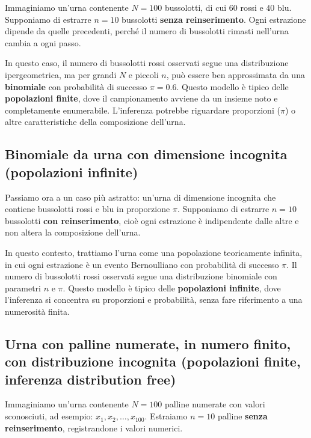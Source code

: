 \documentclass[
  11pt,
]{book}
\theoremstyle{mytheoremstyle}
\theoremstyle{mydefstyle}
\begin{document}
Immaginiamo un'urna contenente \(N = 100\) bussolotti, di cui \(60\) rossi e \(40\) blu. Supponiamo di estrarre \(n = 10\) bussolotti \textbf{senza reinserimento}. Ogni estrazione dipende da quelle precedenti, perché il numero di bussolotti rimasti nell'urna cambia a ogni passo.

In questo caso, il numero di bussolotti rossi osservati segue una distribuzione ipergeometrica, ma per grandi \(N\) e piccoli \(n\), può essere ben approssimata da una \textbf{binomiale} con probabilità di successo \(\pi = 0.6\). Questo modello è tipico delle \textbf{popolazioni finite}, dove il campionamento avviene da un insieme noto e completamente enumerabile. L'inferenza potrebbe riguardare proporzioni (\(\pi\)) o altre caratteristiche della composizione dell'urna.

\subsection{Binomiale da urna con dimensione incognita (popolazioni infinite)}\label{binomiale-da-urna-con-dimensione-incognita-popolazioni-infinite}

Passiamo ora a un caso più astratto: un'urna di dimensione incognita che contiene bussolotti rossi e blu in proporzione \(\pi\). Supponiamo di estrarre \(n = 10\) bussolotti \textbf{con reinserimento}, cioè ogni estrazione è indipendente dalle altre e non altera la composizione dell'urna.

In questo contesto, trattiamo l'urna come una popolazione teoricamente infinita, in cui ogni estrazione è un evento Bernoulliano con probabilità di successo \(\pi\). Il numero di bussolotti rossi osservati segue una distribuzione binomiale con parametri \(n\) e \(\pi\). Questo modello è tipico delle \textbf{popolazioni infinite}, dove l'inferenza si concentra su proporzioni e probabilità, senza fare riferimento a una numerosità finita.

\subsection{Urna con palline numerate, in numero finito, con distribuzione incognita (popolazioni finite, inferenza distribution free)}\label{urna-con-palline-numerate-in-numero-finito-con-distribuzione-incognita-popolazioni-finite-inferenza-distribution-free}

Immaginiamo un'urna contenente \(N = 100\) palline numerate con valori sconosciuti, ad esempio: \(x_1, x_2, \dots, x_{100}\). Estraiamo \(n = 10\) palline \textbf{senza reinserimento}, registrandone i valori numerici.
\end{document}
